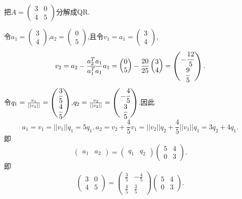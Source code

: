 ﻿\documentclass{book} \usepackage{exsheets} \usepackage{xeCJK}
\begin{document}
\begin{question}
  把$A=
  \begin{pmatrix}
    3&0\\
    4&5
  \end{pmatrix}
$分解成QR.
\end{question}
\begin{solution}
  令$a_1=
  \begin{pmatrix}
    3\\
4
  \end{pmatrix}
$,$a_2=
\begin{pmatrix}
  0\\
5
\end{pmatrix}
$,且令$v_1=a_1=
\begin{pmatrix}
  3\\
4
\end{pmatrix}
$,
$$
v_2=a_2-\frac{a_2^Ta_1}{a_1^Ta_1}a_1=
\begin{pmatrix}
  0\\
5
\end{pmatrix}-\frac{20}{25}
\begin{pmatrix}
  3\\
4
\end{pmatrix}=
\begin{pmatrix}
  -\cfrac{12}{5}\\
  \cfrac{9}{5}
\end{pmatrix}.
$$
令$q_1=\frac{v_1}{||v_1||}=
\begin{pmatrix}
  \cfrac{3}{5}\\
  \cfrac{4}{5}
\end{pmatrix}
$,$q_2=\frac{v_2}{||v_2||}=
\begin{pmatrix}
  -\cfrac{4}{5}\\
  \cfrac{3}{5}
\end{pmatrix}
$.因此
$$
a_1=v_1=||v_1||q_1=5q_1,a_2=v_2+\frac{4}{5}v_1=||v_2||q_2+\frac{4}{5}||v_1||q_1=3q_2+4q_1.
$$
即
$$
\begin{pmatrix}
  a_1&a_2
\end{pmatrix}=
\begin{pmatrix}
  q_1&q_2
\end{pmatrix}
\begin{pmatrix}
  5&4\\
0&3
\end{pmatrix}.
$$
即
$$
\begin{pmatrix}
  3&0\\
  4&5
\end{pmatrix}=
\begin{pmatrix}
  \frac{3}{5}&-\frac{4}{5}\\
  \frac{4}{5}&\frac{3}{5}
\end{pmatrix}
\begin{pmatrix}
  5&4\\
  0&3
\end{pmatrix}.
$$
\end{solution}
\end{document}
